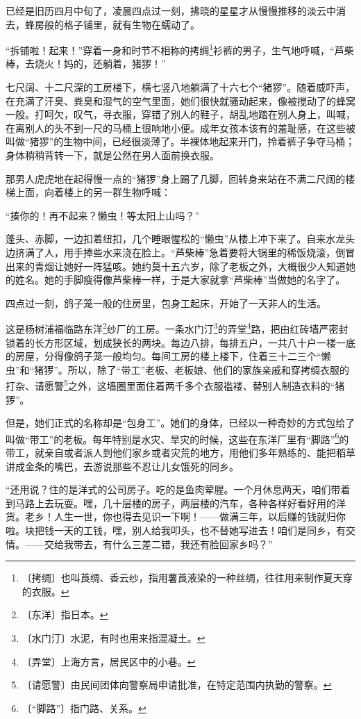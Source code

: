 \documentclass[12pt,UTF-8,openany]{ctexbook}
\begin{document}
\begin{large}
    
    已经是旧历四月中旬了，凌晨四点过一刻，拂晓的星星才从慢慢推移的淡云中消去，蜂房般的格子铺里，就有生物在蠕动了。
    
    “拆铺啦！起来！”穿着一身和时节不相称的拷绸\footnote{〔拷绸〕也叫莨绸、香云纱，指用薯莨液染的一种丝绸，往往用来制作夏天穿的衣服。}衫裤的男子，生气地呼喊，“芦柴棒，去烧火！妈的，还躺着，猪猡！”
    
    七尺阔、十二尺深的工房楼下，横七竖八地躺满了十六七个“猪猡”。随着威吓声，在充满了汗臭、粪臭和湿气的空气里面，她们很快就骚动起来，像被搅动了的蜂窝一般。打呵欠，叹气，寻衣服，穿错了别人的鞋子，胡乱地踏在别人身上，叫喊，在离别人的头不到一尺的马桶上很响地小便。成年女孩本该有的羞耻感，在这些被叫做“猪猡”的生物中间，已经很淡薄了。半裸体地起来开门，拎着裤子争夺马桶；身体稍稍背转一下，就是公然在男人面前换衣服。
    
    那男人虎虎地在起得慢一点的“猪猡”身上踢了几脚，回转身来站在不满二尺阔的楼梯上面，向着楼上的另一群生物呼喊：
    
    “揍你的！再不起来？懒虫！等太阳上山吗？”
    
    蓬头、赤脚，一边扣着纽扣，几个睡眼惺松的“懒虫”从楼上冲下来了。自来水龙头边挤满了人，用手捧些水来浇在脸上。“芦柴棒”急着要将大锅里的稀饭烧滚，倒冒出来的青烟让她好一阵猛咳。她约莫十五六岁，除了老板之外，大概很少人知道她的姓名。她的手脚瘦得像芦柴棒一样，于是大家就拿“芦柴棒”当做她的名字了。
    
    四点过一刻，鸽子笼一般的住房里，包身工起床，开始了一天非人的生活。
    
    这是杨树浦福临路东洋\footnote{〔东洋〕指日本。}纱厂的工房。一条水门汀\footnote{〔水门汀〕水泥，有时也用来指混凝土。}的弄堂\footnote{〔弄堂〕上海方言，居民区中的小巷。}路，把由红砖墙严密封锁着的长方形区域，划成狭长的两块。每边八排，每排五户，一共八十户一楼一底的房屋，分得像鸽子笼一般均匀。每间工房的楼上楼下，住着三十二三个“懒虫”和“猪猡”。所以，除了“带工”老板、老板娘、他们的家族亲戚和穿拷绸衣服的打杂、请愿警\footnote{〔请愿警〕由民间团体向警察局申请批准，在特定范围内执勤的警察。}之外，这墙圈里面住着两千多个衣服褴褛、替别人制造衣料的“猪猡”。
    
    但是，她们正式的名称却是“包身工”。她们的身体，已经以一种奇妙的方式包给了叫做“带工”的老板。每年特别是水灾、旱灾的时候，这些在东洋厂里有“脚路”\footnote{〔“脚路”〕指门路、关系。}的带工，就亲自或者派人到他们家乡或者灾荒的地方，用他们多年熟练的、能把稻草讲成金条的嘴巴，去游说那些不忍让儿女饿死的同乡。
    
    “还用说？住的是洋式的公司房子。吃的是鱼肉荤腥。一个月休息两天，咱们带着到马路上去玩耍。嘿，几十层楼的房子，两层楼的汽车，各种各样好看好用的洋货。老乡！人生一世，你也得去见识一下啊！——做满三年，以后赚的钱就归你啦。块把钱一天的工钱，嘿，别人给我叩头，也不替她写进去！咱们是同乡，有交情。——交给我带去，有什么三差二错，我还有脸回家乡吗？”
    

\end{large}
\end{document}
